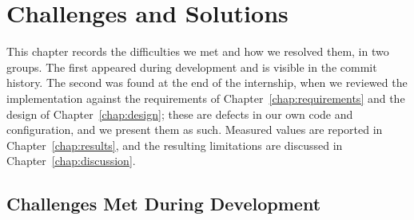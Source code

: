 \chapter{Challenges and Solutions}
\label{chap:challenges}

This chapter records the difficulties we met and how we resolved them, in two groups. The first appeared during development and is visible in the commit history. The second was found at the end of the internship, when we reviewed the implementation against the requirements of Chapter~\ref{chap:requirements} and the design of Chapter~\ref{chap:design}; these are defects in our own code and configuration, and we present them as such. Measured values are reported in Chapter~\ref{chap:results}, and the resulting limitations are discussed in Chapter~\ref{chap:discussion}.

\section{Challenges Met During Development}

